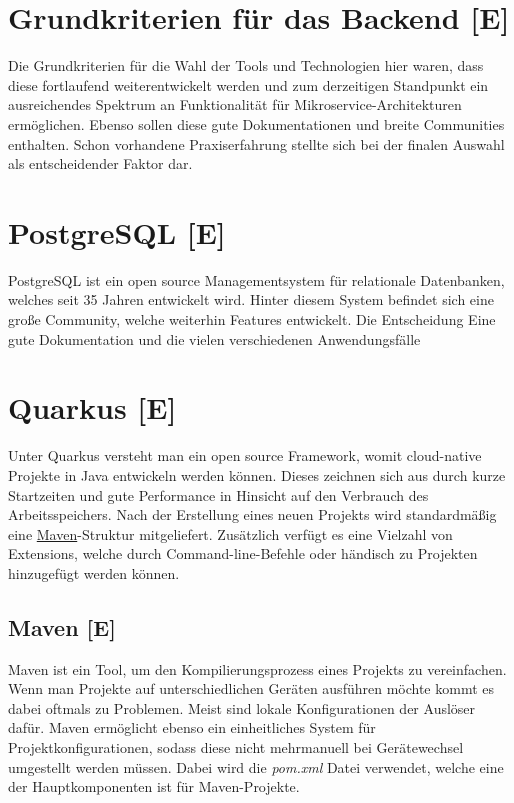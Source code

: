 \section{Grundkriterien für das Backend [E]}
Die Grundkriterien für die Wahl der Tools und Technologien hier waren, dass diese fortlaufend weiterentwickelt werden 
und zum derzeitigen Standpunkt ein ausreichendes Spektrum an Funktionalität für Mikroservice-Architekturen ermöglichen.\cite{MicroserviceAbout} 
Ebenso sollen diese gute Dokumentationen und breite Communities enthalten. Schon vorhandene Praxiserfahrung stellte sich bei der finalen Auswahl als entscheidender Faktor dar.

\section{PostgreSQL [E]}
PostgreSQL ist ein open source Managementsystem für relationale Datenbanken, welches seit 35 Jahren entwickelt wird. 
Hinter diesem System befindet sich eine große Community, welche weiterhin Features entwickelt. 
Die Entscheidung  Eine gute Dokumentation und die vielen verschiedenen Anwendungsfälle 
\cite{PostgreSQLAbout}

\section{Quarkus [E]}
Unter Quarkus versteht man ein open source Framework, womit cloud-native Projekte in Java entwickeln werden können. 
Dieses zeichnen sich aus durch kurze Startzeiten und gute Performance in Hinsicht auf den Verbrauch des Arbeitsspeichers. 
Nach der Erstellung eines neuen Projekts wird standardmäßig eine \hyperref[ch::MavenTool]{Maven}-Struktur mitgeliefert.
Zusätzlich verfügt es eine Vielzahl von Extensions, welche durch Command-line-Befehle oder händisch zu Projekten hinzugefügt werden können.

\cite{QuarkusAbout, QuarkusFirstApplication}

\subsection{Maven [E]}
\label{ch::MavenTool}
Maven ist ein Tool, um den Kompilierungsprozess eines Projekts zu vereinfachen. 
Wenn man Projekte auf unterschiedlichen Geräten ausführen möchte kommt es dabei oftmals zu Problemen. Meist sind lokale Konfigurationen der Auslöser dafür.
Maven ermöglicht ebenso ein einheitliches System für Projektkonfigurationen, sodass diese nicht mehrmanuell bei Gerätewechsel umgestellt werden müssen. 
Dabei wird die \emph{pom.xml} Datei verwendet, welche eine der Hauptkomponenten ist für Maven-Projekte.
\cite{MavenAbout}

